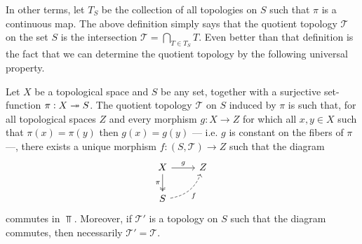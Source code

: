 In other terms, let \(T_S\) be the collection of all topologies on \(S\) such
that \(\pi\) is a continuous map. The above definition simply says that the
quotient topology \(\mathcal T\) on the set \(S\) is the intersection \(\mathcal
T = \bigcap_{T \in T_S}T\). Even better than that definition is the fact that we can
determine the quotient topology by the following universal property.

\begin{theorem}
\label{thm:universal-property-quotient-topology}
Let \(X\) be a topological space and \(S\) be any set, together with a
surjective set-function \(\pi: X \twoheadrightarrow S\). The quotient topology \(\mathcal T\)
on \(S\) induced by \(\pi\) is such that, for all topological spaces \(Z\) and
every morphism \(g: X \to Z\) for which all \(x, y \in X\) such that \(\pi(x) =
\pi(y)\) then \(g(x) = g(y)\) --- i.e. \(g\) is constant on the fibers of \(\pi\)
---, there exists a unique morphism \(f: (S, \mathcal T) \to Z\) such that the
diagram
\[
  \begin{tikzcd}
    X \ar[r, "g"] \ar[d, two heads, swap, "\pi"] &Z\\
    S \ar[ur, swap, bend right, dashed, "f"]
  \end{tikzcd}
\]
commutes in \(\Top\). Moreover, if \(\mathcal T'\) is a topology on \(S\) such
that the diagram commutes, then necessarily \(\mathcal T' = \mathcal T\).
\end{theorem}


